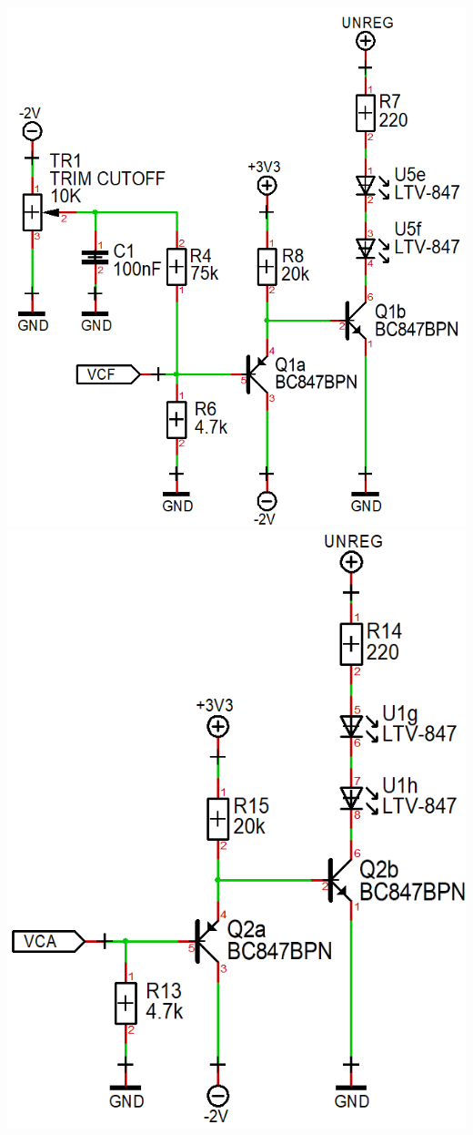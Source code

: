 \documentclass{scrartcl}
\begin{document}
\begin{center}
    \includegraphics[scale=0.42]{assets/schema-expo-vcf.png}
    \includegraphics[scale=0.42]{assets/schema-expo-vca.png}
\end{center}
\end{document}
